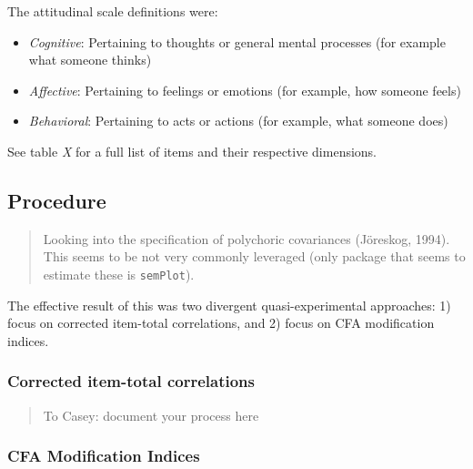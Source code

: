 \documentclass[
  english,
  man]{apa6}
\begin{document}
The attitudinal scale definitions were:

\begin{itemize}
\item
  \emph{Cognitive}: Pertaining to thoughts or general mental processes (for example what someone thinks)
\item
  \emph{Affective}: Pertaining to feelings or emotions (for example, how someone feels)
\item
  \emph{Behavioral}: Pertaining to acts or actions (for example, what someone does)
\end{itemize}

See table \emph{X} for a full list of items and their respective dimensions.

\hypertarget{procedure}{%
\subsection{Procedure}\label{procedure}}

\begin{quote}
Looking into the specification of polychoric covariances (Jöreskog, 1994). This seems to be not very commonly leveraged (only package that seems to estimate these is \texttt{semPlot}).
\end{quote}

The effective result of this was two divergent quasi-experimental approaches: 1) focus on corrected item-total correlations, and 2) focus on CFA modification indices.

\hypertarget{corrected-item-total-correlations}{%
\subsubsection{Corrected item-total correlations}\label{corrected-item-total-correlations}}

\begin{quote}
To Casey: document your process here
\end{quote}

\hypertarget{cfa-modification-indices}{%
\subsubsection{CFA Modification Indices}\label{cfa-modification-indices}}
\end{document}
